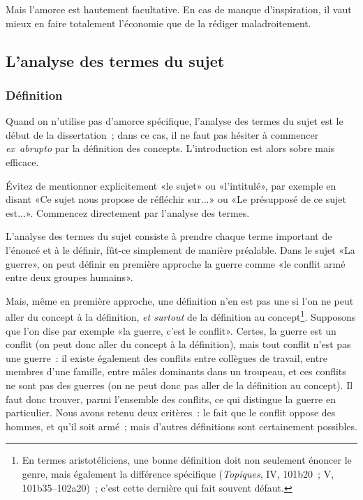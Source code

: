 \documentclass[a4paper,11pt]{article}
\begin{document}
\par

Mais l'amorce est hautement facultative. En cas de manque d'inspiration,
il vaut mieux en faire totalement l'économie que de la rédiger
maladroitement.



\subsection{L'analyse des termes du sujet}

\subsubsection{Définition}

Quand on n'utilise pas d'amorce spécifique, l'analyse des termes du
sujet est le début de la dissertation~; dans ce cas, il ne faut pas
hésiter à commencer \emph{ex~abrupto} par la définition des
concepts. L'introduction est alors sobre mais efficace.

\par

Évitez de mentionner explicitement «le sujet» ou «l'intitulé», par
exemple en disant «Ce sujet nous propose de réfléchir sur...» ou «Le
présupposé de ce sujet est...». Commencez directement par l'analyse des
termes.

\par

L'analyse des termes du sujet consiste à prendre chaque terme important
de l'énoncé et à le définir, fût-ce simplement de manière
préalable. Dans le sujet «La guerre», on peut définir en première
approche la guerre comme «le conflit armé entre deux groupes humains».

\par

Mais, même en première approche, une définition n'en est pas une si l'on
ne peut aller du concept à la définition, \emph{et surtout} de la
définition au concept\footnote{En termes aristotéliciens, une bonne
  définition doit non seulement énoncer le genre, mais également la
  différence spécifique (\emph{Topiques}, IV, 101b20~; V,
  101b35--102a20)~; c'est cette dernière qui fait souvent
  défaut.}. Supposons que l'on dise par exemple «la guerre, c'est le
conflit». Certes, la guerre est un conflit (on peut donc aller du
concept à la définition), mais tout conflit n'est pas une guerre~: il
existe également des conflits entre collègues de travail, entre membres
d'une famille, entre mâles dominants dans un troupeau, et ces conflits
ne sont pas des guerres (on ne peut donc pas aller de la définition au
concept). Il faut donc trouver, parmi l'ensemble des conflits, ce qui
distingue la guerre en particulier. Nous avons retenu deux critères~: le
fait que le conflit oppose des hommes, et qu'il soit armé~; mais
d'autres définitions sont certainement possibles.
\end{document}

